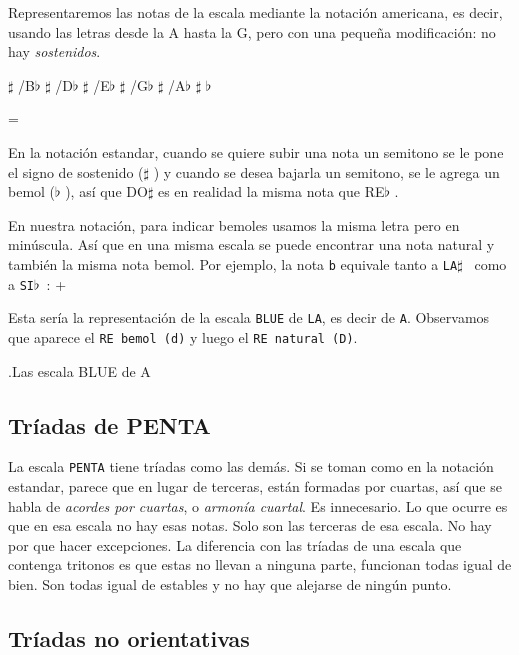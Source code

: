 \documentclass[]{article}
\begin{document}
Representaremos las notas de la escala mediante la notación americana, es decir, usando las letras desde la A hasta la G, pero con una pequeña modificación: no hay \emph{sostenidos}.



$\sharp$  /B$\flat$  $\sharp$  /D$\flat$  $\sharp$  /E$\flat$  $\sharp$  /G$\flat$  $\sharp$  /A$\flat$  $\sharp$  $\flat$

 =

En la notación estandar, cuando se quiere subir una nota un semitono se le pone el signo de sostenido ($\sharp$  ) y cuando se desea bajarla un semitono, se le agrega un bemol ($\flat$  ), así que DO$\sharp$   es en realidad la misma nota que RE$\flat$  .

En nuestra notación, para indicar bemoles usamos la misma letra pero en minúscula. Así que en una misma escala se puede encontrar una nota natural y también la misma nota bemol. Por ejemplo, la nota \texttt{b} equivale tanto a \texttt{LA$\sharp$  } como a \texttt{SI$\flat$  }: +

Esta sería la representación de la escala \texttt{BLUE} de \texttt{LA}, es decir de \texttt{A}. Observamos que aparece el \texttt{RE\ bemol\ (d)} y luego el \texttt{RE\ natural\ (D)}.

.Las escala BLUE de A

\subsection{Tríadas de PENTA}

La escala \texttt{PENTA} tiene tríadas como las demás. Si se toman como en la notación estandar, parece que en lugar de terceras, están formadas por cuartas, así que se habla de \emph{acordes por cuartas}, o \emph{armonía cuartal}. Es innecesario. Lo que ocurre es que en esa escala no hay esas notas. Solo son las terceras de esa escala. No hay por que hacer excepciones. La diferencia con las tríadas de una escala que contenga tritonos es que estas no llevan a ninguna parte, funcionan todas igual de bien. Son todas igual de estables y no hay que alejarse de ningún punto.

\subsection{Tríadas no orientativas}
\end{document}
